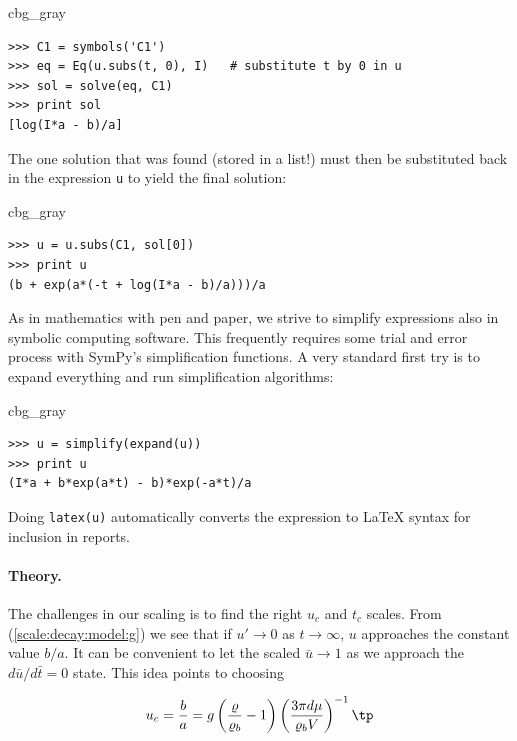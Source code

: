 \documentclass[graybox,envcountchap,sectrefs,final]{svmonodo}
\newenvironment{_cod_tight}[1]{
   \def\FrameCommand{\colorbox{#1}}
   \FrameRule0.6pt\MakeFramed {\FrameRestore}\vskip3mm}
   {\vskip0mm\endMakeFramed}
\newenvironment{cod}[1]{
\bgroup\rmfamily
\fboxsep=0mm\relax
\begin{_cod_tight}{#1}
\list{}{\parsep=-2mm\parskip=0mm\topsep=0pt\leftmargin=2mm
\rightmargin=2\leftmargin\leftmargin=4pt\relax}
\item\relax}
{\endlist\end{_cod_tight}\egroup}
\newenvironment{notice_mdfboxadmon}[1][]{
\begin{notice_mdfboxmdframed}[frametitle=#1]
}
{
\end{notice_mdfboxmdframed}
}
\begin{document}
\begin{notice_mdfboxadmon}
\begin{cod}{cbg_gray}\begin{Verbatim}[numbers=none,fontsize=\fontsize{9pt}{9pt},baselinestretch=0.95,xleftmargin=2mm]
>>> C1 = symbols('C1')
>>> eq = Eq(u.subs(t, 0), I)   # substitute t by 0 in u
>>> sol = solve(eq, C1)
>>> print sol
[log(I*a - b)/a]
\end{Verbatim}
\end{cod}
\noindent
The one solution that was found (stored in a list!)
must then be substituted back in the
expression \texttt{u} to yield the final solution:

\begin{cod}{cbg_gray}\begin{Verbatim}[numbers=none,fontsize=\fontsize{9pt}{9pt},baselinestretch=0.95,xleftmargin=2mm]
>>> u = u.subs(C1, sol[0])
>>> print u
(b + exp(a*(-t + log(I*a - b)/a)))/a
\end{Verbatim}
\end{cod}
\noindent
As in mathematics with pen and paper, we strive to simplify
expressions also in symbolic computing software.
This frequently requires some trial and error
process with SymPy's simplification functions. A very standard
first try is to expand everything and run simplification algorithms:

\begin{cod}{cbg_gray}\begin{Verbatim}[numbers=none,fontsize=\fontsize{9pt}{9pt},baselinestretch=0.95,xleftmargin=2mm]
>>> u = simplify(expand(u))
>>> print u
(I*a + b*exp(a*t) - b)*exp(-a*t)/a
\end{Verbatim}
\end{cod}
\noindent
Doing \texttt{latex(u)} automatically converts the expression to {\LaTeX} syntax
for inclusion in reports.
\end{notice_mdfboxadmon}



\paragraph{Theory.}
The challenges in our scaling is to find the right $u_c$ and $t_c$
scales. From (\ref{scale:decay:model:g}) we see that if $u'\rightarrow 0$
as $t\rightarrow\infty$, $u$ approaches the constant value $b/a$. It can be
convenient to let the scaled $\bar u\rightarrow 1$ as
we approach the $d\bar u/d\bar t = 0$ state. This idea points to choosing

\begin{equation}
u_c = \frac{b}{a} = g\left(\frac{\varrho}{\varrho_b} -1\right)\left(\frac{3\pi d\mu}{\varrho_b V}\right)^{-1}
\tp
\end{equation}
\end{document}
